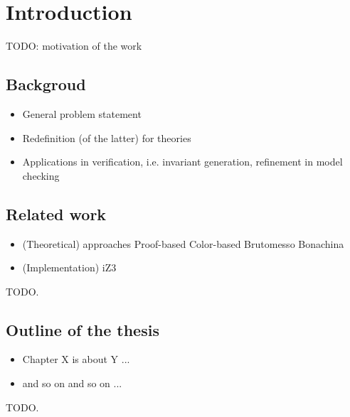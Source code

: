 \chapter{Introduction}

TODO: motivation of the work

\section{\label{section:backgroud}Backgroud}

\begin{itemize}
\item General problem statement
\item Redefinition (of the latter) for theories 
\item Applications in verification, i.e. invariant generation, refinement in model checking
\end{itemize}

\section{Related work}

\begin{itemize}
\item (Theoretical) approaches
Proof-based
Color-based
Brutomesso 
Bonachina
\item (Implementation)
iZ3
\end{itemize}

TODO.

\section{Outline of the thesis}

\begin{itemize}
\item Chapter X is about Y ...
\item and so on and so on ...
\end{itemize}


TODO.

